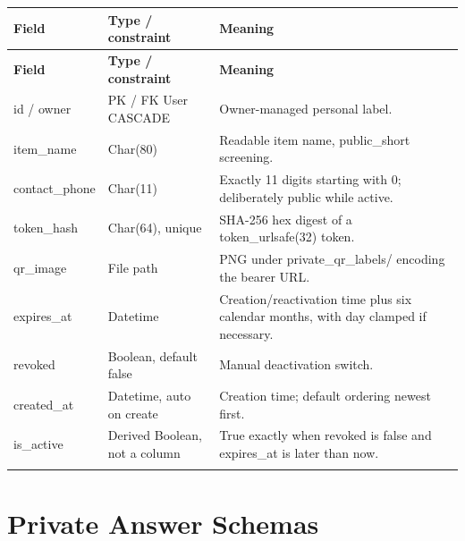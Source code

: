 \documentclass[12pt,a4paper,oneside]{report}
\begin{document}
\begin{longtable}{@{}P{0.24\dimexpr\textwidth-24pt\relax}P{0.28\dimexpr\textwidth-24pt\relax}P{0.48\dimexpr\textwidth-24pt\relax}@{}}

\toprule \textbf{Field} & \textbf{Type / constraint} & \textbf{Meaning} \\ \midrule\endfirsthead

\toprule \textbf{Field} & \textbf{Type / constraint} & \textbf{Meaning} \\ \midrule\endhead

\bottomrule\endfoot

id / owner & PK / FK User CASCADE & Owner-managed personal label. \\ \addlinespace[3pt]

item\_name & Char(80) & Readable item name, public\_short screening. \\ \addlinespace[3pt]

contact\_phone & Char(11) & Exactly 11 digits starting with 0; deliberately public while active. \\ \addlinespace[3pt]

token\_hash & Char(64), unique & SHA-256 hex digest of a token\_urlsafe(32) token. \\ \addlinespace[3pt]

qr\_image & File path & PNG under private\_qr\_labels/ encoding the bearer URL. \\ \addlinespace[3pt]

expires\_at & Datetime & Creation/reactivation time plus six calendar months, with day clamped if necessary. \\ \addlinespace[3pt]

revoked & Boolean, default false & Manual deactivation switch. \\ \addlinespace[3pt]

created\_at & Datetime, auto on create & Creation time; default ordering newest first. \\ \addlinespace[3pt]

is\_active & Derived Boolean, not a column & True exactly when revoked is false and expires\_at is later than now. \\ \addlinespace[3pt]

\end{longtable}


\section{Private Answer Schemas}
\end{document}
